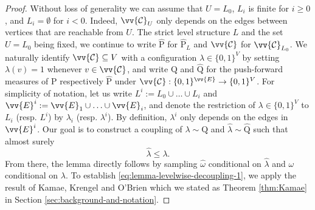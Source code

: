 \documentclass[11pt]{article}
\renewcommand{\P}{\mathrm{P}}
\theoremstyle{remark}
\begin{document}
\begin{proof} 
	Without loss of generality we can assume that $U = L_0$, $L_i$ is finite for $i\ge 0$, and $L_i = \emptyset$ for $i<0$. Indeed, $\vv{\mathcal{C}}_U$ only depends on the edges between vertices that are reachable from $U$.
	The strict level structure $L$ and the set $U=L_0$ being fixed, we continue to write $\hat{\P}$ for $\hat{\P}_L$ and $\vv{\mathcal{C}}$ for $\vv{\mathcal{C}}_{L_0}$. 
	We naturally identify $\vv{\mathcal{C}} \subseteq V$ with a configuration $\lambda \in \{0,1\}^V$ by setting $\lambda(v)=1$ whenever $v \in \vv{\mathcal{C}}$, and write $\mathrm Q$ and $\hat{\mathrm Q}$ for the push-forward measures of $\P$ respectively $\hat{\P}$ under $\vv{\mathcal{C}} : \{0,1\}^{\vv{E}} \to \{0,1\}^V$.
	For simplicity of notation, let us write $L^i := L_0 \cup \ldots \cup L_i$ and $\vv{E}^i := \vv{E}_{1} \cup \ldots \cup \vv{E}_{i}$, and denote the restriction of $\lambda \in \{0,1\}^V$ to $L_i$ (resp. $L^i$) by $\lambda_i$ (resp. $\lambda^i$). By definition, $\lambda^i$ only depends on the edges in $\vv{E}^i$.
	Our goal is to construct a coupling of $\lambda \sim \mathrm Q$ and $\hat{\lambda} \sim \hat{\mathrm{Q}}$ such that almost surely 
	\begin{equation}\label{eq:lemma-levelwise-decoupling-1}
		\hat{\lambda} \le \lambda.
	\end{equation} 
	From there, the lemma directly follows by sampling $\hat{\omega}$ conditional on $\hat{\lambda}$ and $\omega$ conditional on $\lambda$. To establish \eqref{eq:lemma-levelwise-decoupling-1}, we apply the result of Kamae, Krengel and O'Brien \cite{Kamae1977} which we stated as Theorem \ref{thm:Kamae} in Section \ref{sec:background-and-notation}. 
	

\end{proof}
\end{document}
